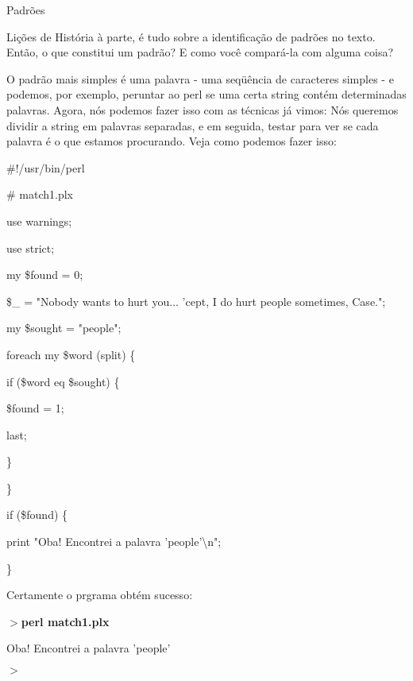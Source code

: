 \documentclass[a4paper,11pt]{book}
\begin{document}
\noindent 

\noindent Padrões

\noindent Lições de História à parte, é tudo sobre a identificação de padrões no texto. Então, o que constitui um padrão? E como você compará-la com alguma coisa?

\noindent 

\noindent O padrão mais simples é uma palavra - uma seqüência de caracteres simples - e podemos, por exemplo, peruntar ao perl se uma certa string contém determinadas palavras. Agora, nós podemos fazer isso com as técnicas já vimos: Nós queremos dividir a string em palavras separadas, e em seguida, testar para ver se cada palavra é o que estamos procurando. Veja como podemos fazer isso:

\noindent 

\noindent \#!/usr/bin/perl

\noindent \# match1.plx

\noindent use warnings;

\noindent use strict;

\noindent 

\noindent my \$found = 0;

\noindent \$\_  = "Nobody wants to hurt you... 'cept, I do hurt people sometimes, Case.";

\noindent 

\noindent my \$sought = "people";

\noindent 

\noindent foreach my \$word (split) \{

\noindent if (\$word eq \$sought) \{

\noindent \$found = 1;

\noindent last;

\noindent \}

\noindent \}

\noindent 

\noindent if (\$found) \{

\noindent print "Oba! Encontrei a palavra 'people'\textbackslash n";

\noindent \}

\noindent 

\noindent Certamente o prgrama obtém sucesso:

\noindent 

\noindent $>$\textbf{perl match1.plx}

\noindent Oba! Encontrei a palavra 'people'

\noindent $>$
\end{document}
